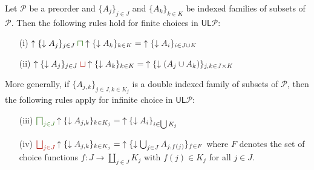 \documentclass[12pt]{article}
\theoremstyle{definition}
\theoremstyle{plain}
\theoremstyle{plain}
\theoremstyle{plain}
\theoremstyle{plain}
\theoremstyle{remark}
\theoremstyle{remark}
\newcommand{\mc}[1]{\mathcal{#1}}
\newcommand{\low}{\mathsf{L}}
\newcommand{\upper}{\mathsf{U}}
\newcommand{\upc}[1]{{\uparrow #1}}
\newcommand{\lwc}[1]{{\downarrow #1}}
\newcommand{\cbigsqcap}[1]{\color{OliveGreen}\bigsqcap_{#1}\color{Black}}
\newcommand{\csqcap}{\color{OliveGreen}\bm{\sqcap}\color{Black}}
\newcommand{\cbigsqcup}[1]{\color{BrickRed}\bigsqcup_{#1}\color{Black}}
\newcommand{\csqcup}{\color{BrickRed}\bm{\sqcup}\color{Black}}
\begin{document}
\begin{tcolorbox}[title = \hypertarget{box:calc rules} {Calculation Rules} for Upper and Lower Closures, colframe=TealBlue, coltitle=Sepia, colback=paleteal] 
		Let $\mc{P}$ be a preorder and $\{A_j\}_{j \in J}$ and $\{A_k\}_{k \in K}$ be indexed families of subsets of $\mc{P}$. Then the following rules hold for finite choices in $\upper\low\mc{P}$:
		\begin{itemize}
			\item[(i)] $\upc{\{ \lwc{A_j} \}_{j \in J}} \csqcap \upc{\{ \lwc{A_k} \}_{k \in K}} = \upc \{ \lwc{A_i} \}_{i \in J \cup K}$
			\item[(ii)] $\upc{\{ \lwc{A_j} \}_{j \in J}} \csqcup \upc{\{ \lwc{A_k} \}_{k \in K}} = \upc \{ \lwc{(A_j \cup A_k)} \}_{j,k \in J \times K}$
		\end{itemize}
		More generally, if $\{ A_{j,k} \}_{j \in J, k \in K_j}$ is a double indexed family of subsets of $\mc{P}$, then the following rules apply for infinite choice in $\upper\low\mc{P}$:
		\begin{itemize}
			\item[(iii)] $\cbigsqcap{j \in J} \upc{\{ \lwc{A_{j,k}} \}_{k \in K_j}} = \upc \{ \lwc{A_i} \}_{i \in \bigcup K_j }$
			\item[(iv)] $\cbigsqcup{j \in J} \upc{\{ \lwc{A_{j,k}} \}_{k \in K_j}} = \upc \{ \lwc{ \bigcup_{j \in J} A_{j,f(j)}} \}_{f \in F}$ \newline where $F$ denotes the set of choice functions $f: J \rightarrow \coprod_{j \in J} K_j$ with $f(j) \in K_j$ for all $j \in J$.
\end{itemize}
\end{tcolorbox}
\end{document}
